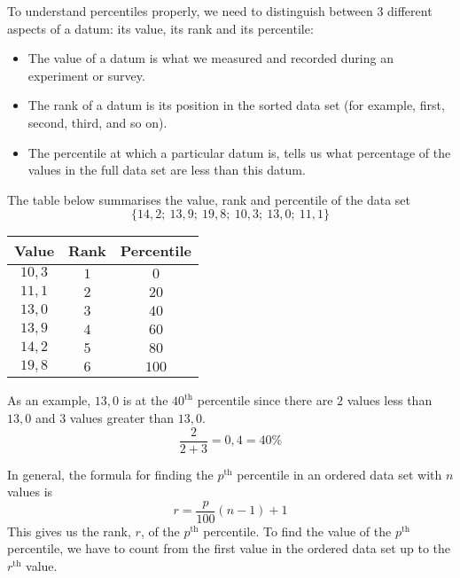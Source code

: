 To understand percentiles properly, we need to distinguish between $3$
different aspects of a datum: its value, its rank and its
percentile:
\begin{itemize}
 \item The value of a datum is what we measured and recorded
during an experiment or survey. 
\item The rank of a datum is its position in
the sorted data set (for example, first, second, third, and so
on). 
\item The percentile at which a particular datum is, tells us what
percentage of the values in the full data set are less than this
datum.
\end{itemize}
\par
  The table below summarises the value, rank and percentile of the
  data set
  \begin{equation*}
    \{14,2;\ 13,9;\ 19,8;\ 10,3;\ 13,0;\ 11,1\}
  \end{equation*}

  \begin{center}
    \begin{tabular}{|c|c|c|} \hline

      \textbf{Value} & \textbf{Rank} & \textbf{Percentile} \\\hline

      $10,3$  & $1$    & $0$ \\\hline
      $11,1$  & $2$    & $20$ \\\hline
      $13,0$  & $3$    & $40$ \\\hline
      $13,9$  & $4$    & $60$ \\\hline
      $14,2$  & $5$    & $80$ \\\hline
      $19,8$  & $6$    & $100$ \\\hline

    \end{tabular}
  \end{center}

 As an example, $13,0$ is at the $40^{\mathrm{th}}$ percentile since there are
  $2$ values less than $13,0$ and $3$ values greater than $13,0$.
  \begin{equation*}
    \frac{2}{2+3} = 0,4 = 40\%
  \end{equation*}

In general, the formula for finding the $p^{\mathrm{th}}$ percentile in an ordered
data set with $n$ values is
\begin{equation*}
  r = \frac{p}{100}\left(n-1\right)+1
\end{equation*}
This gives us the rank, $r$, of the $p^{\mathrm{th}}$ percentile. To find the
value of the $p^{\mathrm{th}}$ percentile, we have to count from the first value in
the ordered data set up to the $r^{\mathrm{th}}$ value.

